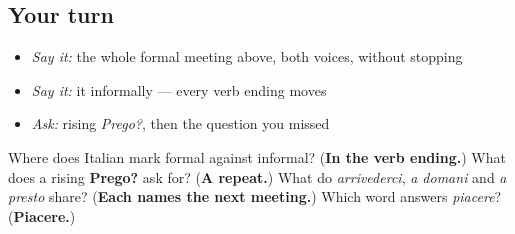 \subsection*{Your turn}
\begin{itemize}
\raggedright
  \item \emph{Say it:} the whole formal meeting above, both voices, without stopping
  \item \emph{Say it:} it informally — every verb ending moves
  \item \emph{Ask:} rising \emph{Prego?}, then the question you missed
\end{itemize}

\begin{tcolorbox}[breakable,colback=teal!4,colframe=teal!35!black,title={Before you move on}]
Where does Italian mark formal against informal? (\textbf{In the verb ending.}) What does a rising \textbf{Prego?} ask for? (\textbf{A repeat.}) What do \emph{arrivederci}, \emph{a domani} and \emph{a presto} share? (\textbf{Each names the next meeting.}) Which word answers \emph{piacere}? (\textbf{Piacere.})
\end{tcolorbox}
